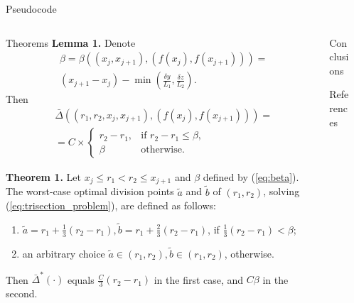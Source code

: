 \documentclass[final]{beamer}
\newlength{\sepwid}
\newlength{\onecolwid}
\newlength{\twocolwid}
\begin{document}
\begin{frame}[t]
\begin{columns}[t]
\begin{column}{\twocolwid}
      \begin{alertblock}{Pseudocode}		%
      \end{alertblock}

      \begin{columns}[t,totalwidth=\twocolwid]
        \begin{column}{\onecolwid}
        \begin{block}{Theorems}
	\textbf{Lemma 1.}
	Denote 
	\begin{align}
	\label{eq:beta}
	&\beta = \beta((x_j, x_{j+1}), (f(x_j), f(x_{j+1}))) =\\\nonumber
	&(x_{j+1}-x_j) - \min\left(\frac{\delta y}{L_1}, \frac{\delta z}{L_2}\right).
	\end{align}
	Then 
	\begin{align}
	&\bar{\Delta}((r_1, r_2, x_j, x_{j+1}), (f(x_j), f(x_{j+1})))= \\\nonumber
	&=C \times
	\begin{cases}
	\label{eq:delta_general}
	r_2 - r_1, & \text{if } r_2 - r_1 \le \beta, \\
	\beta & \text{otherwise.}
	\end{cases}
	\end{align}

	\textbf{Theorem 1.}
	Let $x_j \le r_1 < r_2 \le x_{j+1}$ and $\beta$ defined by (\ref{eq:beta}). The worst-case optimal division points $\tilde{a}$ and $\tilde{b}$ of $(r_1, r_2)$, solving (\ref{eq:trisection_problem}),  are defined as follows:
	\begin{enumerate}[1)]
	\item $\tilde{a}=r_1+\frac{1}{3}(r_2-r_1), \tilde{b}=r_1+\frac{2}{3}(r_2-r_1)$, if $\frac{1}{3}(r_2-r_1) < \beta$;
	\item an arbitrary choice $\tilde{a} \in (r_1, r_2), \tilde{b} \in (r_1, r_2)$, otherwise.
	\end{enumerate}
	Then $\bar{\Delta}^*(\cdot)$ equals $\frac{C}{3}(r_2-r_1)$ in the first case, and $C\beta$ in the second.
        \end{block}

        \end{column}
        \begin{column}{\onecolwid}

     	\begin{block}{Conclusions}
     	\end{block}
    	\begin{block}{References}
    	    
    	\end{block}

      \end{column}
    \end{columns}
  \end{column}

  \begin{column}{\sepwid}\end{column}			%
 \end{columns}
\end{frame}
\end{document}
